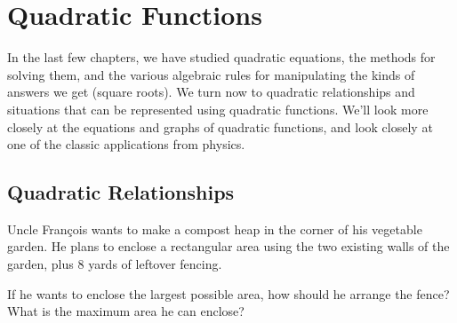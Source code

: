 \chapter{Quadratic Functions}
\label{ch:quadfunc}


In the last few chapters, we have studied quadratic equations, the methods for solving them, and the various algebraic rules for manipulating the kinds of answers we get (square roots). We turn now to quadratic relationships and situations that can be represented using quadratic functions. We'll look more closely at the equations and graphs of quadratic functions, and look closely at one of the classic applications from physics.

\section{Quadratic Relationships}
\label{sec:quadrelationships}


\begin{boxedexplore}
Uncle Fran\c{c}ois wants to make a compost heap in the corner of his vegetable garden. He plans to enclose a rectangular area using the two existing walls of the garden, plus 8 yards of leftover fencing.

\begin{center}
\end{center}

If he wants to enclose the largest possible area, how should he arrange the fence? What is the maximum area he can enclose?
\end{boxedexplore}

